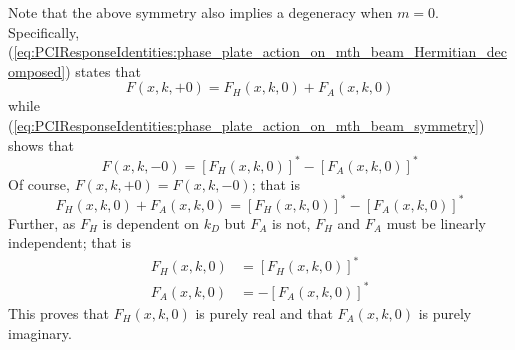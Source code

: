 Note that the above symmetry also implies a degeneracy when $m = 0$.
Specifically,
(\ref{eq:PCIResponseIdentities:phase_plate_action_on_mth_beam_Hermitian_decomposed})
states that
\begin{equation}
  F(x, k, +0)
  =
  F_H(x, k, 0)
  +
  F_A(x, k, 0)
  \label{eq:PCIResponseIdentities:phase_plate_action_on_+0_beam}
\end{equation}
while (\ref{eq:PCIResponseIdentities:phase_plate_action_on_mth_beam_symmetry})
shows that
\begin{equation}
  F(x, k, -0)
  =
  [F_H(x, k, 0)]^*
  -
  [F_A(x, k, 0)]^*
  \label{eq:PCIResponseIdentities:phase_plate_action_on_-0_beam}
\end{equation}
Of course, $F(x, k, +0) = F(x, k, -0)$; that is
\begin{equation}
  F_H(x, k, 0)
  +
  F_A(x, k, 0)
  =
  [F_H(x, k, 0)]^*
  -
  [F_A(x, k, 0)]^*
\end{equation}
Further, as $F_H$ is dependent on $k_D$ but $F_A$ is not,
$F_H$ and $F_A$ must be linearly independent;
that is
\begin{align}
  F_H(x, k, 0) &= [F_H(x, k, 0)]^*
  \\
  F_A(x, k, 0) &= -[F_A(x, k, 0)]^*
\end{align}
This proves that $F_H(x, k, 0)$ is purely real and
that $F_A(x, k, 0)$ is purely imaginary.
